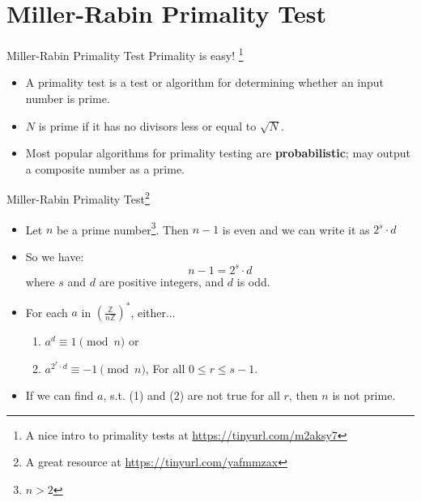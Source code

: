 \documentclass{beamer}
\begin{document}
\section{Miller-Rabin Primality Test}

\begin{frame}{Miller-Rabin Primality Test}
    Primality is easy! \footnote{A nice intro to primality tests at \url{https://tinyurl.com/m2aksy7}}
    \begin{itemize}
        \item A primality test is a test or algorithm for determining whether an input number is prime.
        \item $N$ is prime if it has no divisors less or equal to $\sqrt{N}$.
        \item Most popular algorithms for primality testing are \textbf{probabilistic}; may output a composite number as a prime.
    \end{itemize}
\end{frame}

\begin{frame}{Miller-Rabin Primality Test\footnote{A great resource at \url{https://tinyurl.com/yafmmzax}}}
    \begin{itemize}
        \item Let $n$ be a prime number\footnote{$n > 2$}. Then $n - 1$ is even and we can write it as $2^{s} \cdot d$
        \item So we have: $$n - 1 = 2^{s} \cdot d$$where $s$ and $d$ are positive integers, and $d$ is odd. 
        \item For each $a$ in $(\frac{\mathbb{Z}}{n\mathbb{Z}})^{*}$, either...
        \begin{enumerate}
            \item $a^{d} \equiv 1 \pmod n$ or    
            \item $a^{2^r \cdot d} \equiv -1 \pmod n$, {\scriptsize For all $0 \leq r \leq s - 1$.}
        \end{enumerate}
        \item If we can find $a$, s.t. (1) and (2) are not true for all $r$, then $n$ is not prime.
    \end{itemize}
\end{frame}
\end{document}
